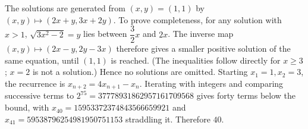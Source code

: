 The solutions are generated from $(x,y)=(1,1)$ by $(x,y)\mapsto(2x+y,3x+2y)$. To prove completeness, for any solution with $x>1$, $\sqrt{3x^2-2}=y$ lies between $\dfrac{3}{2}x$ and $2x$. The inverse map $(x,y)\mapsto(2x-y,2y-3x)$ therefore gives a smaller positive solution of the same equation, until $(1,1)$ is reached. (The inequalities follow directly for $x\ge3$; $x=2$ is not a solution.) Hence no solutions are omitted. Starting $x_1=1,x_2=3$, the recurrence is $x_{n+2}=4x_{n+1}-x_n$. Iterating with integers and comparing successive terms to $2^{75}=37778931862957161709568$ gives forty terms below the bound, with $x_{40}=15953372374843566659921$ and $x_{41}=59538796254981950751153$ straddling it. Therefore $\boxed{40}$.

